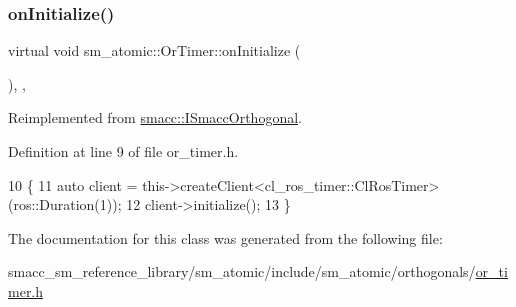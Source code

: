\subsubsection{\texorpdfstring{on\+Initialize()}{onInitialize()}}
{\footnotesize\ttfamily virtual void sm\+\_\+atomic\+::\+Or\+Timer\+::on\+Initialize (\begin{DoxyParamCaption}{ }\end{DoxyParamCaption})\hspace{0.3cm}{\ttfamily [inline]}, {\ttfamily [override]}, {\ttfamily [virtual]}}



Reimplemented from \hyperlink{classsmacc_1_1ISmaccOrthogonal_a6bb31c620cb64dd7b8417f8705c79c7a}{smacc\+::\+I\+Smacc\+Orthogonal}.



Definition at line 9 of file or\+\_\+timer.\+h.


\begin{DoxyCode}
10     \{
11         \textcolor{keyword}{auto} client = this->createClient<cl\_ros\_timer::ClRosTimer>(ros::Duration(1));
12         client->initialize();
13     \}
\end{DoxyCode}


The documentation for this class was generated from the following file\+:\begin{DoxyCompactItemize}
\item 
smacc\+\_\+sm\+\_\+reference\+\_\+library/sm\+\_\+atomic/include/sm\+\_\+atomic/orthogonals/\hyperlink{sm__atomic_2include_2sm__atomic_2orthogonals_2or__timer_8h}{or\+\_\+timer.\+h}\end{DoxyCompactItemize}
